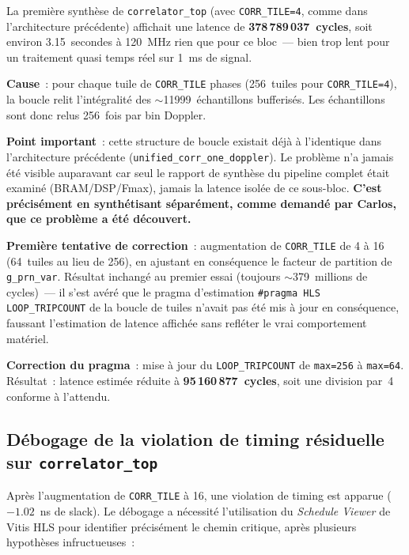 \documentclass[11pt,a4paper]{article}
\begin{document}
La première synthèse de \texttt{correlator\_top} (avec \texttt{CORR\_TILE=4}, comme dans l'architecture précédente) affichait une latence de \textbf{378\,789\,037~cycles}, soit environ 3.15~secondes à 120~MHz rien que pour ce bloc~--- bien trop lent pour un traitement quasi temps réel sur 1~ms de signal.

\textbf{Cause}~: pour chaque tuile de \texttt{CORR\_TILE} phases (256~tuiles pour \texttt{CORR\_TILE=4}), la boucle relit l'intégralité des $\sim$11999~échantillons bufferisés. Les échantillons sont donc relus 256~fois par bin Doppler.

\textbf{Point important}~: cette structure de boucle existait déjà à l'identique dans l'architecture précédente (\texttt{unified\_corr\_one\_doppler}). Le problème n'a jamais été visible auparavant car seul le rapport de synthèse du pipeline complet était examiné (BRAM/DSP/Fmax), jamais la latence isolée de ce sous-bloc. \textbf{C'est précisément en synthétisant séparément, comme demandé par Carlos, que ce problème a été découvert.}

\textbf{Première tentative de correction}~: augmentation de \texttt{CORR\_TILE} de 4 à 16 (64~tuiles au lieu de 256), en ajustant en conséquence le facteur de partition de \texttt{g\_prn\_var}. Résultat inchangé au premier essai (toujours $\sim$379~millions de cycles)~--- il s'est avéré que le pragma d'estimation \texttt{\#pragma HLS LOOP\_TRIPCOUNT} de la boucle de tuiles n'avait pas été mis à jour en conséquence, faussant l'estimation de latence affichée sans refléter le vrai comportement matériel.

\textbf{Correction du pragma}~: mise à jour du \texttt{LOOP\_TRIPCOUNT} de \texttt{max=256} à \texttt{max=64}. Résultat~: latence estimée réduite à \textbf{95\,160\,877~cycles}, soit une division par~4 conforme à l'attendu.

\subsection{Débogage de la violation de timing résiduelle sur \texttt{correlator\_top}}

Après l'augmentation de \texttt{CORR\_TILE} à 16, une violation de timing est apparue ($-1.02$~ns de slack). Le débogage a nécessité l'utilisation du \textit{Schedule Viewer} de Vitis HLS pour identifier précisément le chemin critique, après plusieurs hypothèses infructueuses~:
\end{document}
